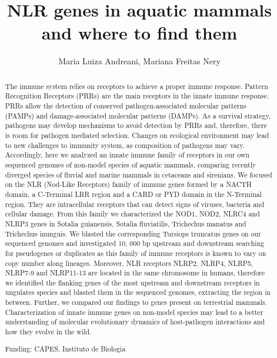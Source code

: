 \documentclass[twoside]{article}
\title{\vspace{-15mm}\fontsize{24pt}{10pt}\selectfont\textbf{ NLR genes in aquatic mammals and where to find them }} %
\author{ Maria Luiza Andreani, Mariana Freitas Nery }
\affil{ Unicamp }
\date{}
\begin{document}
  
  
  \maketitle %
  
  
  \thispagestyle{fancy} %
  
  
  \begin{abstract}
  The immune system relies on receptors to achieve a proper immune response. Pattern Recognition Receptors (PRRs) are the main receptors in the innate immune response. PRRs allow the detection of conserved pathogen-associated molecular patterns (PAMPs) and damage-associated molecular patterns (DAMPs). As a survival strategy,  pathogens may develop mechanisms to avoid detection by PRRs and,  therefore,  there is room for pathogen mediated selection. Changes on ecological environment may lead to new challenges to immunity system,  as composition of pathogens may vary. Accordingly,  here we analyzed an innate immune family of receptors in our own sequenced genomes of non-model species of aquatic mammals,  comparing recently diverged species of fluvial and marine mammals in cetaceans and sirenians. We focused on the NLR (Nod-Like Receptors) family of immune genes formed by a NACTH domain,  a C-Terminal LRR region and a CARD or PYD domain in the N-Terminal region. They are intracellular receptors that can detect signs of viruses,  bacteria and cellular damage. From this family we characterized the NOD1,  NOD2,  NLRC4 and NLRP3 genes in Sotalia guianensis,  Sotalia fluviatilis,  Trichechus manatus and Trichechus inunguis. We blasted the corresponding Tursiops truncatus genes on our sequenced genomes and investigated 10, 000 bp upstream and downstream searching for pseudogenes or duplicates as this family of immune receptors is known to vary on copy number along lineages. Moreover,  NLR receptors NLRP2,  NLRP4,  NLRP5,  NLRP7-9 and NLRP11-13 are located in the same chromosome in humans,  therefore we identified the flanking genes of the most upstream and downstream receptors in ungulates species and blasted them in the sequenced genomes,  extracting the region in between. Further,  we compared our findings to genes present on terrestrial mammals. Characterization of innate immune genes on non-model species may lead to a better understanding of molecular evolutionary dynamics of host-pathogen interactions and how they evolve in the wild.
  
  Funding: CAPES,  Instituto de Biologia \\ 
  \end{abstract}
  
\end{document}
